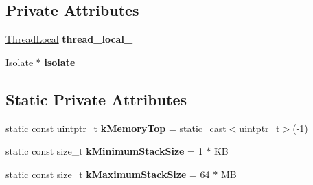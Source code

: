 \subsection*{Private Attributes}
\begin{DoxyCompactItemize}
\item 
\hyperlink{structv8_1_1internal_1_1_reg_exp_stack_1_1_thread_local}{Thread\+Local} {\bfseries thread\+\_\+local\+\_\+}\hypertarget{classv8_1_1internal_1_1_reg_exp_stack_ac7d461981122197ce028ed76d5c91d14}{}\label{classv8_1_1internal_1_1_reg_exp_stack_ac7d461981122197ce028ed76d5c91d14}

\item 
\hyperlink{classv8_1_1internal_1_1_isolate}{Isolate} $\ast$ {\bfseries isolate\+\_\+}\hypertarget{classv8_1_1internal_1_1_reg_exp_stack_ac5e587f2e6b23650da555bea4fd62efe}{}\label{classv8_1_1internal_1_1_reg_exp_stack_ac5e587f2e6b23650da555bea4fd62efe}

\end{DoxyCompactItemize}
\subsection*{Static Private Attributes}
\begin{DoxyCompactItemize}
\item 
static const uintptr\+\_\+t {\bfseries k\+Memory\+Top} = static\+\_\+cast$<$uintptr\+\_\+t$>$(-\/1)\hypertarget{classv8_1_1internal_1_1_reg_exp_stack_a9441306b3a2fe5257026fbc5fc0dc377}{}\label{classv8_1_1internal_1_1_reg_exp_stack_a9441306b3a2fe5257026fbc5fc0dc377}

\item 
static const size\+\_\+t {\bfseries k\+Minimum\+Stack\+Size} = 1 $\ast$ KB\hypertarget{classv8_1_1internal_1_1_reg_exp_stack_ac44a225cef79e10c580acf9e74960179}{}\label{classv8_1_1internal_1_1_reg_exp_stack_ac44a225cef79e10c580acf9e74960179}

\item 
static const size\+\_\+t {\bfseries k\+Maximum\+Stack\+Size} = 64 $\ast$ MB\hypertarget{classv8_1_1internal_1_1_reg_exp_stack_ab5b9761ecdc17df0b546694d7aba3741}{}\label{classv8_1_1internal_1_1_reg_exp_stack_ab5b9761ecdc17df0b546694d7aba3741}

\end{DoxyCompactItemize}
